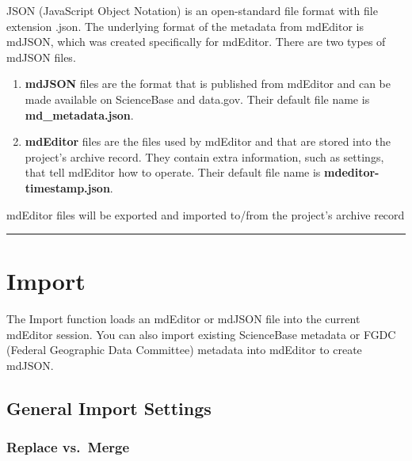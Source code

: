 \documentclass[
]{book}
\makeatletter
\providecommand{\tightlist}{%
  \setlength{\itemsep}{0pt}\setlength{\parskip}{0pt}}
\newenvironment{kframe}{%
\medskip{}
\setlength{\fboxsep}{.8em}
 \def\at@end@of@kframe{}%
 \ifinner\ifhmode%
  \def\at@end@of@kframe{\end{minipage}}%
  \begin{minipage}{\columnwidth}%
 \fi\fi%
 \def\FrameCommand##1{\hskip\@totalleftmargin \hskip-\fboxsep
 \colorbox{shadecolor}{##1}\hskip-\fboxsep
     \hskip-\linewidth \hskip-\@totalleftmargin \hskip\columnwidth}%
 \MakeFramed {\advance\hsize-\width
   \@totalleftmargin\z@ \linewidth\hsize
   \@setminipage}}%
 {\par\unskip\endMakeFramed%
 \at@end@of@kframe}
\newenvironment{rmdblock}[1]
  {
  \begin{itemize}
  \renewcommand{\labelitemi}{
    \raisebox{-.7\height}[0pt][0pt]{
      {\setkeys{Gin}{width=3em,keepaspectratio}\texttt{[image: images/\#1]}}
    }
  }
  \setlength{\fboxsep}{1em}
  \begin{kframe}
  \item
  }
  {
  \end{kframe}
  \end{itemize}
  }
\newenvironment{rmdtip}
  {\begin{rmdblock}{tip}}
  {\end{rmdblock}}
\makeatother
\begin{document}
JSON (JavaScript Object Notation) is an open-standard file format with file extension .json. The underlying format of the metadata from mdEditor is mdJSON, which was created specifically for mdEditor. There are two types of mdJSON files.

\begin{enumerate}
\def\labelenumi{\arabic{enumi}.}
\tightlist
\item
  \textbf{mdJSON} files are the format that is published from mdEditor and can be made available on ScienceBase and data.gov. Their default file name is \textbf{md\_metadata.json}.
\item
  \textbf{mdEditor} files are the files used by mdEditor and that are stored into the project's archive record. They contain extra information, such as settings, that tell mdEditor how to operate. Their default file name is \textbf{mdeditor-timestamp.json}.
\end{enumerate}

\begin{rmdtip}
mdEditor files will be exported and imported to/from the project's
archive record
\end{rmdtip}

\begin{center}\rule{0.5\linewidth}{\linethickness}\end{center}

\hypertarget{import}{%
\section*{Import}\label{import}}

The Import function loads an mdEditor or mdJSON file into the current mdEditor session. You can also import existing ScienceBase metadata or FGDC (Federal Geographic Data Committee) metadata into mdEditor to create mdJSON.

\hypertarget{general-import-settings}{%
\subsection*{General Import Settings}\label{general-import-settings}}

\hypertarget{replace-vs.-merge}{%
\subsubsection*{Replace vs.~Merge}\label{replace-vs.-merge}}
\end{document}
